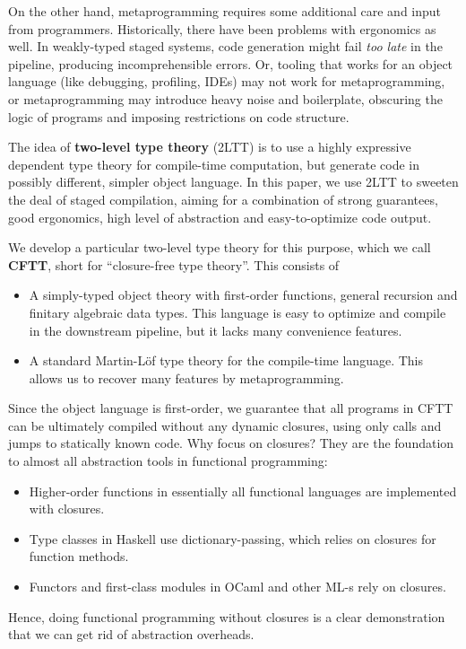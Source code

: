 \documentclass[acmsmall,screen,review,anonymous]{acmart}
\theoremstyle{remark}
\begin{document}
On the other hand, metaprogramming requires some additional care and input from
programmers. Historically, there have been problems with ergonomics as well. In
weakly-typed staged systems, code generation might fail \emph{too late} in the
pipeline, producing incomprehensible errors. Or, tooling that works for an
object language (like debugging, profiling, IDEs) may not work for metaprogramming, or
metaprogramming may introduce heavy noise and boilerplate, obscuring the logic
of programs and imposing restrictions on code structure.

The idea of \textbf{two-level type theory} (2LTT) is to use a highly expressive
dependent type theory for compile-time computation, but generate code in
possibly different, simpler object language. In this paper, we use 2LTT to sweeten the
deal of staged compilation, aiming for a combination of strong guarantees, good
ergonomics, high level of abstraction and easy-to-optimize code output.

We develop a particular two-level type theory for this purpose, which we
call \textbf{CFTT}, short for ``closure-free type theory''. This consists
of
\begin{itemize}
\item A simply-typed object theory with first-order functions, general recursion and
      finitary algebraic data types. This language is easy to optimize and compile
      in the downstream pipeline, but it lacks many convenience features.
\item A standard Martin-Löf type theory for the compile-time language. This
      allows us to recover many features by metaprogramming.
\end{itemize}

Since the object language is first-order, we guarantee that all programs in CFTT
can be ultimately compiled without any dynamic closures, using only calls and
jumps to statically known code. Why focus on closures?  They are the
foundation to almost all abstraction tools in functional programming:
\begin{itemize}
\item Higher-order functions in essentially all functional languages are implemented with closures.
\item Type classes in Haskell use dictionary-passing, which relies on closures for function methods.
\item Functors and first-class modules in OCaml and other ML-s rely on closures.
\end{itemize}
Hence, doing functional programming without closures is a clear demonstration
that we can get rid of abstraction overheads.
\end{document}
